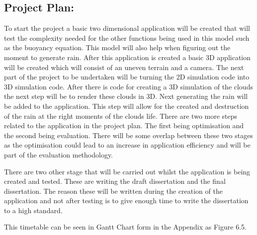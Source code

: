 \subsection{Project Plan:}
To start the project a basic two dimensional application will be created that will test the complexity needed for the other functions being used in this model such as the buoyancy equation.
This model will also help when figuring out the moment to generate rain.
After this application is created a basic 3D application will be created which will consist of an uneven terrain and a camera. 
The next part of the project to be undertaken will be turning the 2D simulation code into 3D simulation code.
After there is code for creating a 3D simulation of the clouds the next step will be to render these clouds in 3D.
Next generating the rain will be added to the application.
This step will allow for the created and destruction of the rain at the right moments of the clouds life.
There are two more steps related to the application in the project plan.
The first being optimisation and the second being evaluation.
There will be some overlap between these two stages as the optimisation could lead to an increase in application efficiency and will be part of the evaluation methodology. 

There are two other stage that will be carried out whilst the application is being created and tested.
These are writing the draft dissertation and the final dissertation.
The reason these will be written during the creation of the application and not after testing is to give enough time to write the dissertation to a high standard.

This timetable can be seen in Gantt Chart form in the Appendix as Figure 6.5. 